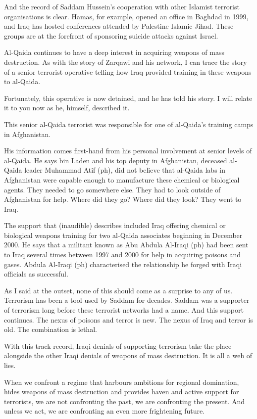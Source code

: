 \documentclass[10pt,a4paper]{article}
\begin{document}
And the record of Saddam Hussein's cooperation with other Islamist terrorist organisations is clear. Hamas, for example, opened an office in Baghdad in 1999, and Iraq has hosted conferences attended by Palestine Islamic Jihad. These groups are at the forefront of sponsoring suicide attacks against Israel.

Al-Qaida continues to have a deep interest in acquiring weapons of mass destruction. As with the story of Zarqawi and his network, I can trace the story of a senior terrorist operative telling how Iraq provided training in these weapons to al-Qaida.

Fortunately, this operative is now detained, and he has told his story. I will relate it to you now as he, himself, described it.

This senior al-Qaida terrorist was responsible for one of al-Qaida's training camps in Afghanistan.

His information comes first-hand from his personal involvement at senior levels of al-Qaida. He says bin Laden and his top deputy in Afghanistan, deceased al-Qaida leader Muhammad Atif (ph), did not believe that al-Qaida labs in Afghanistan were capable enough to manufacture these chemical or biological agents. They needed to go somewhere else. They had to look outside of Afghanistan for help. Where did they go? Where did they look? They went to Iraq.

The support that (inaudible) describes included Iraq offering chemical or biological weapons training for two al-Qaida associates beginning in December 2000. He says that a militant known as Abu Abdula Al-Iraqi (ph) had been sent to Iraq several times between 1997 and 2000 for help in acquiring poisons and gases. Abdula Al-Iraqi (ph) characterised the relationship he forged with Iraqi officials as successful.

As I said at the outset, none of this should come as a surprise to any of us. Terrorism has been a tool used by Saddam for decades. Saddam was a supporter of terrorism long before these terrorist networks had a name. And this support continues. The nexus of poisons and terror is new. The nexus of Iraq and terror is old. The combination is lethal.

With this track record, Iraqi denials of supporting terrorism take the place alongside the other Iraqi denials of weapons of mass destruction. It is all a web of lies.

When we confront a regime that harbours ambitions for regional domination, hides weapons of mass destruction and provides haven and active support for terrorists, we are not confronting the past, we are confronting the present. And unless we act, we are confronting an even more frightening future.
\end{document}
